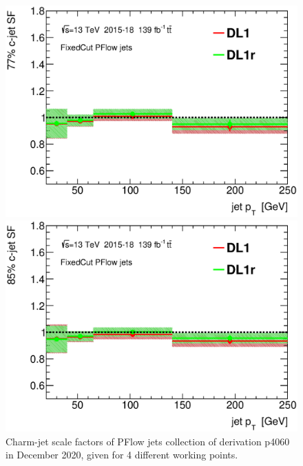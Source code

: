\documentclass[letterpaper,12pt]{article}
\begin{document}
\begin{figure}[H]
\begin{minipage}[b]{.45\textwidth}
\includegraphics[width=1\textwidth]{SFplots_december/DL1allPFlowDec_DL1rallPFlowDec/SF77.eps}
\end{minipage}\hfill
\begin{minipage}[b]{.45\textwidth}
\centering
\includegraphics[width=1\textwidth]{SFplots_december/DL1allPFlowDec_DL1rallPFlowDec/SF85.eps}
\end{minipage}
\caption{Charm-jet scale factors of PFlow jets collection of derivation 
p4060 in December 2020, given for 4 different working points.} \label{fig:Dec_SF_PFlow}
\end{figure}
\end{document}
